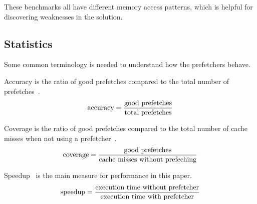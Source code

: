 These benchmarks all have different memory access patterns, which is
helpful for discovering weaknesses in the solution.

\subsection{Statistics}
Some common terminology is needed to understand how the prefetchers
behave.

Accuracy is the ratio of good prefetches compared to the total number
of prefetches~\cite{m5userdoc}.
\begin{equation*}
  \label{eq:acc}
  \textnormal{accuracy} = \frac{\textnormal{good prefetches}}{\textnormal{total prefetches}}
\end{equation*}

Coverage is the ratio of good prefetches compared to the total number
of cache misses when not using a prefetcher~\cite{m5userdoc}.
\begin{equation*}
  \textnormal{coverage}=\frac{\textnormal{good prefetches}}{\textnormal{cache misses without prefeching}}
\end{equation*}

Speedup~\cite{m5userdoc} is the main measure for performance in this
paper.
\begin{equation*}
  \textnormal{speedup}=\frac{\textnormal{execution time without
      prefetcher}}{\textnormal{execution time with prefetcher}}
\end{equation*}

